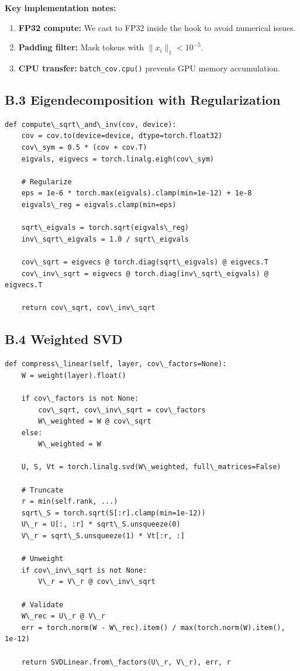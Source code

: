 \textbf{Key implementation notes:}

\begin{enumerate}
\item \textbf{FP32 compute:} We cast to FP32 inside the hook to avoid numerical issues.
\item \textbf{Padding filter:} Mask tokens with $\|x_i\|_1 < 10^{-5}$.
\item \textbf{CPU transfer:} \texttt{batch\_cov.cpu()} prevents GPU memory accumulation.

\end{enumerate}
\subsection{B.3 Eigendecomposition with Regularization}

\begin{lstlisting}
def compute\_sqrt\_and\_inv(cov, device):
    cov = cov.to(device=device, dtype=torch.float32)
    cov\_sym = 0.5 * (cov + cov.T)
    eigvals, eigvecs = torch.linalg.eigh(cov\_sym)
    
    # Regularize
    eps = 1e-6 * torch.max(eigvals).clamp(min=1e-12) + 1e-8
    eigvals\_reg = eigvals.clamp(min=eps)
    
    sqrt\_eigvals = torch.sqrt(eigvals\_reg)
    inv\_sqrt\_eigvals = 1.0 / sqrt\_eigvals
    
    cov\_sqrt = eigvecs @ torch.diag(sqrt\_eigvals) @ eigvecs.T
    cov\_inv\_sqrt = eigvecs @ torch.diag(inv\_sqrt\_eigvals) @ eigvecs.T
    
    return cov\_sqrt, cov\_inv\_sqrt
\end{lstlisting}

\subsection{B.4 Weighted SVD}

\begin{lstlisting}
def compress\_linear(self, layer, cov\_factors=None):
    W = weight(layer).float()
    
    if cov\_factors is not None:
        cov\_sqrt, cov\_inv\_sqrt = cov\_factors
        W\_weighted = W @ cov\_sqrt
    else:
        W\_weighted = W
    
    U, S, Vt = torch.linalg.svd(W\_weighted, full\_matrices=False)
    
    # Truncate
    r = min(self.rank, ...)
    sqrt\_S = torch.sqrt(S[:r].clamp(min=1e-12))
    U\_r = U[:, :r] * sqrt\_S.unsqueeze(0)
    V\_r = sqrt\_S.unsqueeze(1) * Vt[:r, :]
    
    # Unweight
    if cov\_inv\_sqrt is not None:
        V\_r = V\_r @ cov\_inv\_sqrt
    
    # Validate
    W\_rec = U\_r @ V\_r
    err = torch.norm(W - W\_rec).item() / max(torch.norm(W).item(), 1e-12)
    
    return SVDLinear.from\_factors(U\_r, V\_r), err, r
\end{lstlisting}


